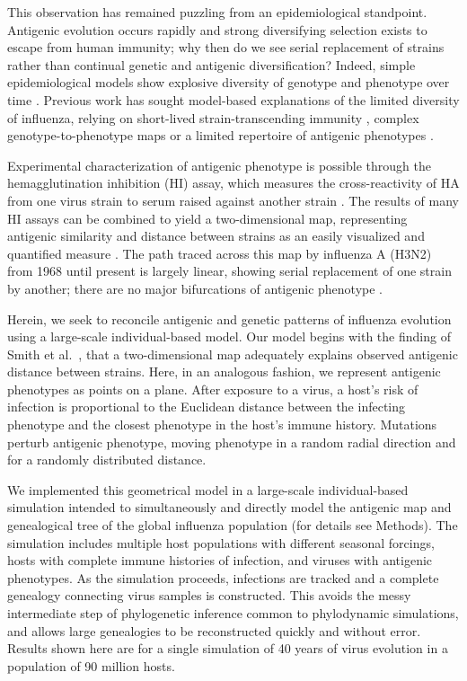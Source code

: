 This observation has remained puzzling from an epidemiological standpoint.  Antigenic evolution occurs rapidly and strong diversifying selection exists to escape from human immunity; why then do we see serial replacement of strains rather than continual genetic and antigenic diversification?  Indeed, simple epidemiological models show explosive diversity of genotype and phenotype over time \cite{Ferguson03,Tria05}.  Previous work has sought model-based explanations of the limited diversity of influenza, relying on short-lived strain-transcending immunity \cite{Ferguson03,Tria05}, complex genotype-to-phenotype maps \cite{Koelle06} or a limited repertoire of antigenic phenotypes \cite{Recker07}. 

Experimental characterization of antigenic phenotype is possible through the hemagglutination inhibition (HI) assay, which measures the cross-reactivity of HA from one virus strain to serum raised against another strain \cite{Hirst43}.  The results of many HI assays can be combined to yield a two-dimensional map, representing antigenic similarity and distance between strains as an easily visualized and quantified measure \cite{Smith04}.  The path traced across this map by influenza A (H3N2) from 1968 until present is largely linear, showing serial replacement of one strain by another; there are no major bifurcations of antigenic phenotype \cite{Smith04}.

Herein, we seek to reconcile antigenic and genetic patterns of influenza evolution using a large-scale individual-based model.  Our model begins with the finding of Smith et al.\ \cite{Smith04}, that a two-dimensional map adequately explains observed antigenic distance between strains.  Here, in an analogous fashion, we represent antigenic phenotypes as points on a plane.  After exposure to a virus, a host's risk of infection is proportional to the Euclidean distance between the infecting phenotype and the closest phenotype in the host's immune history.  Mutations perturb antigenic phenotype, moving phenotype in a random radial direction and for a randomly distributed distance.  

We implemented this geometrical model in a large-scale individual-based simulation intended to simultaneously and directly model the antigenic map and genealogical tree of the global influenza population (for details see Methods).  The simulation includes multiple host populations with different seasonal forcings, hosts with complete immune histories of infection, and viruses with antigenic phenotypes.  As the simulation proceeds, infections are tracked and a complete genealogy connecting virus samples is constructed.  This avoids the messy intermediate step of phylogenetic inference common to phylodynamic simulations, and allows large genealogies to be reconstructed quickly and without error.  Results shown here are for a single simulation of 40 years of virus evolution in a population of 90 million hosts.  

